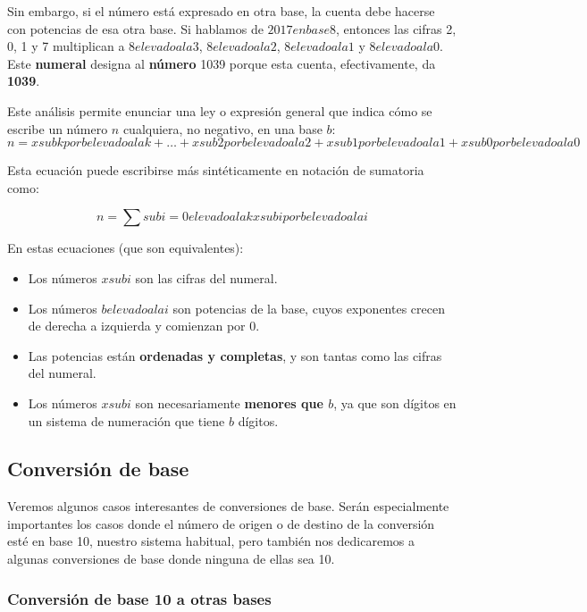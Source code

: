 \documentclass[spanish,A4,]{article}
\begin{document}
Sin embargo, si el número está expresado en otra base, la cuenta debe
hacerse con potencias de esa otra base. Si hablamos de $2017 en base 8$,
entonces las cifras 2, 0, 1 y 7 multiplican a $8 elevado a la 3$, $8 elevado a la 2$, $8 elevado a la 1$ y
$8 elevado a la 0$. Este \textbf{numeral} designa al \textbf{número} 1039 porque esta
cuenta, efectivamente, da \textbf{1039}.

Este análisis permite enunciar una ley o expresión general que indica
cómo se escribe un número $n$ cualquiera, no negativo, en una base $b$:
\[n = x sub k   por  b elevado a la k + \ldots + x sub 2   por  b elevado a la {2} + x sub 1  por  b elevado a la 1 +x sub 0   por  b elevado a la 0\]

Esta ecuación puede escribirse más sintéticamente en notación de
sumatoria como:

\[n = \sum sub i=0  elevado a la {k}{x sub i  por  b elevado a la i}\]

En estas ecuaciones (que son equivalentes):

\begin{itemize}
\itemsep1pt\parskip0pt
\item
  Los números $x sub i$ son las cifras del numeral.
\item
  Los números $b elevado a la i$ son potencias de la base, cuyos exponentes crecen de
  derecha a izquierda y comienzan por 0.
\item
  Las potencias están \textbf{ordenadas y completas}, y son tantas como
  las cifras del numeral.
\item
  Los números $x sub i$ son necesariamente \textbf{menores que $b$}, ya que
  son dígitos en un sistema de numeración que tiene $b$ dígitos.
\end{itemize}

\subsection{Conversión de base}\label{conversiuxf3n-de-base}

Veremos algunos casos interesantes de conversiones de base. Serán
especialmente importantes los casos donde el número de origen o de
destino de la conversión esté en base 10, nuestro sistema habitual, pero
también nos dedicaremos a algunas conversiones de base donde ninguna de
ellas sea 10.

\subsubsection{Conversión de base 10 a otras
bases}\label{conversiuxf3n-de-base-10-a-otras-bases}
\end{document}
